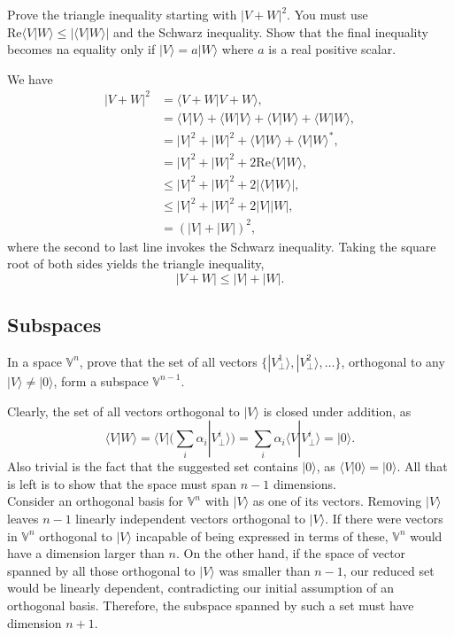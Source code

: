 \documentclass[../principles-of-quantum-mechanics.tex]{subfiles}
\begin{document}
\begin{questions}
\question Prove the triangle inequality starting with $|V+W|^2$. You must use $\mathrm{Re}\langle{V}|W\rangle\leq|\langle{V}|W\rangle|$ and the Schwarz inequality. Show that the final inequality becomes na equality only if $|V\rangle = a|W\rangle$ where $a$ is a real positive scalar.

\begin{solution}
	We have
	\begin{align*}
		|V+W|^2 &= \langle{V + W}|{V + W}\rangle, \\
		&= \langle{V}|V\rangle + \langle{W}|V\rangle + \langle{V}|W\rangle + \langle{W}|W\rangle, \\
		&= |V|^2 + |W|^2 + \langle{V}|W\rangle + \langle{V}|W\rangle^*, \\
		&= |V|^2 + |W|^2 + 2\mathrm{Re}\langle{V}|W\rangle, \\
		&\leq |V|^2 + |W|^2 + 2|\langle{V}|W\rangle|, \\
		&\leq |V|^2 + |W|^2 + 2|V||W|, \\
		&= (|V| + |W|)^2,
	\end{align*}
	where the second to last line invokes the Schwarz inequality. Taking the square root of both sides yields the triangle inequality,
	\[
		|V + W| \leq |V| + |W|.
	\]
\end{solution}

\setcounter{subsection}{3}
\setcounter{question}{0}
\subsection{Subspaces}
\question In a space $\mathbb{V}^n$, prove that the set of all vectors $\{|V_\perp^1\rangle, |V_\perp^2\rangle,\dots\}$, orthogonal to any $|V\rangle\neq|0\rangle$, form a subspace $\mathbb{V}^{n-1}$.

\begin{solution}
	Clearly, the set of all vectors orthogonal to $|V\rangle$ is closed under addition, as 
	\[
		\langle{V}|W\rangle = \langle{V}|\Big(\sum_i\alpha_i|V_\perp^i\rangle\Big) = \sum_i\alpha_i\langle{V}|V_\perp^i\rangle = |0\rangle.
	\]
	Also trivial is the fact that the suggested set contains $|0\rangle$, as $\langle{V}|0\rangle=|0\rangle$. All that is left is to show that the space must span $n-1$ dimensions. \\
	
	Consider an orthogonal basis for $\mathbb{V}^n$ with $|V\rangle$ as one of its vectors. Removing $|V\rangle$ leaves $n-1$ linearly independent vectors orthogonal to $|V\rangle$. If there were vectors in $\mathbb{V}^n$ orthogonal to $|V\rangle$ incapable of being expressed in terms of these, $\mathbb{V}^n$ would have a dimension larger than $n$. On the other hand, if the space of vector spanned by all those orthogonal to $|V\rangle$ was smaller than $n-1$, our reduced set would be linearly dependent, contradicting our initial assumption of an orthogonal basis. Therefore, the subspace spanned by such a set must have dimension $n+1$.
\end{solution}


\end{questions}
\end{document}
